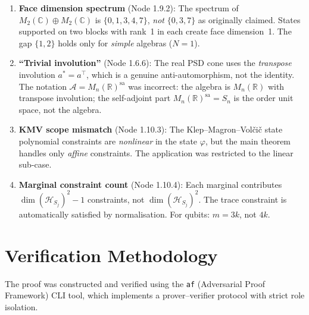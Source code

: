 \documentclass[11pt,a4paper]{article}
\theoremstyle{plain}
\theoremstyle{definition}
\theoremstyle{remark}
\newcommand{\R}{\mathbb{R}}
\newcommand{\C}{\mathbb{C}}
\newcommand{\Hilbert}{\mathcal{H}}
\newcommand{\sa}{\mathrm{sa}}
\begin{document}
\begin{enumerate}
  \item \textbf{Face dimension spectrum} (Node 1.9.2):
        The spectrum of $M_2(\C) \oplus M_2(\C)$ is $\{0, 1, 3, 4, 7\}$,
        \emph{not} $\{0, 3, 7\}$ as originally claimed. States supported
        on two blocks with rank~1 in each create face dimension~1.
        The gap $\{1, 2\}$ holds only for \emph{simple} algebras ($N = 1$).

  \item \textbf{``Trivial involution''} (Node 1.6.6):
        The real PSD cone uses the \emph{transpose} involution $a^* = a^\top$,
        which is a genuine anti-automorphism, not the identity.
        The notation $\mathcal{A} = M_n(\R)^{\sa}$ was incorrect:
        the algebra is $M_n(\R)$ with transpose involution; the
        self-adjoint part $M_n(\R)^{\sa} = S_n$ is the order unit space,
        not the algebra.

  \item \textbf{KMV scope mismatch} (Node 1.10.3):
        The Klep--Magron--Vol\v{c}i\v{c} state polynomial constraints
        are \emph{nonlinear} in the state $\varphi$, but the main theorem
        handles only \emph{affine} constraints. The application was
        restricted to the linear sub-case.

  \item \textbf{Marginal constraint count} (Node 1.10.4):
        Each marginal contributes $\dim(\Hilbert_{S_j})^2 - 1$
        constraints, not $\dim(\Hilbert_{S_j})^2$. The trace constraint
        is automatically satisfied by normalisation.
        For qubits: $m = 3k$, not $4k$.
\end{enumerate}


\section{Verification Methodology}
\label{sec:methodology}

The proof was constructed and verified using the \texttt{af}
(Adversarial Proof Framework) CLI tool, which implements a
prover--verifier protocol with strict role isolation.
\end{document}
